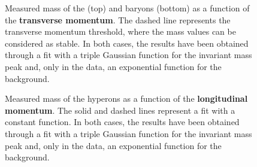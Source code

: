 \begin{figure}[!p]
\hspace*{-2.cm}
\caption{Measured mass of the \rmXi (top) and \rmOmega baryons (bottom) as a function of the \textbf{transverse momentum}. The dashed line represents the transverse momentum threshold, where the mass values can be considered as stable. In both cases, the results have been obtained through a fit with a triple Gaussian function for the invariant mass peak and, only in the data, an exponential function for the background.}
	\label{fig:MassVsPt}
\end{figure}

\begin{figure}[!p]
\hspace*{-2.cm}
\caption{Measured mass of the \rmXi hyperons as a function of the \textbf{longitudinal momentum}. The solid and dashed lines represent a fit with a constant function. In both cases, the results have been obtained through a fit with a triple Gaussian function for the invariant mass peak and, only in the data, an exponential function for the background.}
	\label{fig:MassXiVsPz}
\end{figure}


